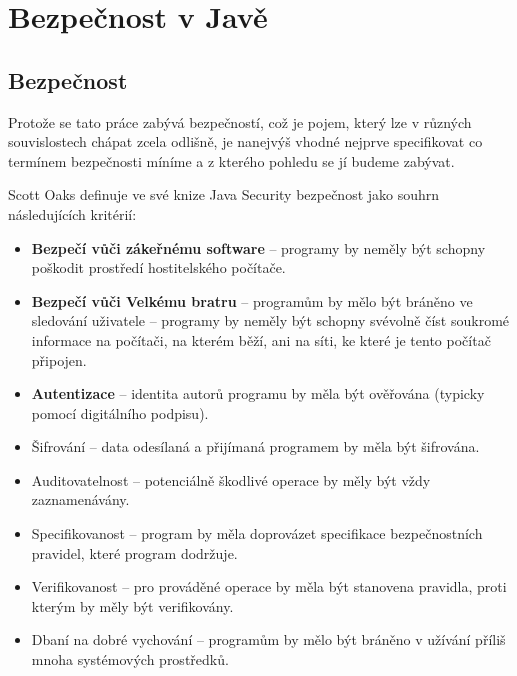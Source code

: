 \chapter{Bezpečnost v Javě} \label{teoretickyUvod}

\section{Bezpečnost}

Protože se tato práce zabývá bezpečností, což je pojem, který lze v různých souvislostech chápat zcela odlišně, je nanejvýš vhodné nejprve specifikovat co termínem bezpečnosti míníme a z kterého pohledu se jí budeme zabývat.

Scott Oaks definuje ve své knize Java Security bezpečnost jako souhrn následujících kritérií: \cite[1.1]{oaks}

\begin{itemize}
  \item {\bf Bezpečí vůči zákeřnému software} -- programy by neměly být schopny poškodit prostředí hostitelského počítače.
  \item {\bf Bezpečí vůči Velkému bratru} -- programům by mělo být bráněno ve sledování uživatele -- programy by neměly být schopny svévolně číst soukromé informace na počítači, na kterém běží, ani na síti, ke které je tento počítač připojen.
  \item {\bf Autentizace} -- identita autorů programu by měla být ověřována (typicky pomocí digitálního podpisu).
  \item Šifrování -- data odesílaná a přijímaná programem by měla být šifrována.
  \item Auditovatelnost -- potenciálně škodlivé operace by měly být vždy zaznamenávány.
  \item Specifikovanost -- program by měla doprovázet specifikace bezpečnostních pravidel, které program dodržuje.
  \item Verifikovanost -- pro prováděné operace by měla být stanovena pravidla, proti kterým by měly být verifikovány.
  \item Dbaní na dobré vychování -- programům by mělo být bráněno v užívání příliš mnoha systémových prostředků.
\end{itemize}


